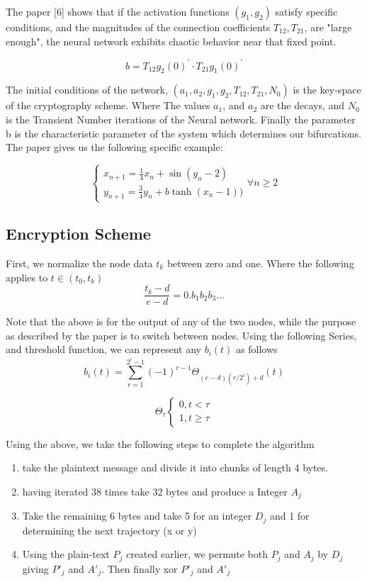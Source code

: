 \documentclass[12pt, letterpaper]{article}
\begin{document}
The paper [6] shows that if the activation functions \((g_{1}, g_{2})\) satisfy specific conditions, and the magnitudes of the connection coefficients \(T_{12}, T_{21}\), are "large enough", the neural network exhibits chaotic behavior near that fixed point.

\begin{equation}\label{b defintion}
b = T_{12}g_{2}(0)^{'} \cdot T_{21}g_{1}(0)^{'}
\end{equation}

The initial conditions of the network, \((a_1, a_2, g_1, g_2, T_{12}, T_{21}, N_{0})\) is the key-space of the cryptography scheme. Where The values \(a_1\), and \(a_2\) are the decays, and \(N_{0}\) is the Transient Number iterations of the Neural network. Finally the parameter b is the characteristic parameter of the system which determines our bifurcations. The paper gives us the following specific example:

\begin{equation}\label{hopfield network}
    \begin{cases}
    x_{n+1} = \frac{1}{4}x_{n} + \sin(y_{n} - 2)\\
    y_{n+1} = \frac{3}{4}y_{n} + b\tanh(x_{n} - 1))
    \end{cases} \forall n \geq 2
\end{equation}

\subsection*{Encryption Scheme}
First, we normalize the node data \(t_{k}\) between zero and one. Where the following applies to \(t \in (t_{0}, t_{k})\)
\[\frac{t_{k} - d}{e -d} = 0.b_{1}b_{2}b_{3}\dots\]

Note that the above is for the output of any of the two nodes, while the purpose as described by the paper is to switch between nodes.
Using the following Series, and threshold function, we can represent any \(b_{i}(t)\) as follows
\[b_{i}(t) = \sum_{r=1}^{2^{i} - 1}(-1)^{r-1}\Theta_{(e - d)(r/2^{i}) + d}(t)\]

\[\Theta_\tau
\begin{cases}
0, t < \tau \\
1, t \geq \tau
\end{cases}
\]

Using the above, we take the following steps to complete the algorithm
\begin{enumerate}
    \item take the plaintext message and divide it into chunks of length 4 bytes.
    \item having iterated 38 times take 32 bytes and produce a Integer \(A_{j}\)
    \item Take the remaining 6 bytes and take 5 for an integer \(D_j\) and 1 for determining the next trajectory (x or y)
    \item Using the plain-text \(P_j\) created earlier, we permute both \(P_j\) and \(A_j\) by \(D_j\) giving \(P'_{j}\) and \(A'_{j}\). Then finally xor \(P'_j\) and \(A'_j\)
\end{enumerate}
\end{document}
